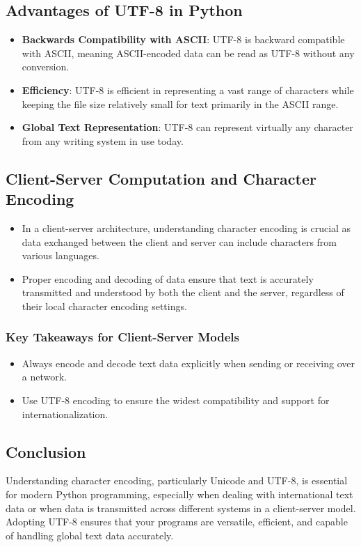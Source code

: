 \documentclass{article}
\begin{document}
\subsection{Advantages of UTF-8 in Python}
\begin{itemize}
    \item \textbf{Backwards Compatibility with ASCII}: UTF-8 is backward compatible with ASCII, meaning ASCII-encoded data can be read as UTF-8 without any conversion.
    \item \textbf{Efficiency}: UTF-8 is efficient in representing a vast range of characters while keeping the file size relatively small for text primarily in the ASCII range.
    \item \textbf{Global Text Representation}: UTF-8 can represent virtually any character from any writing system in use today.
\end{itemize}

\subsection{Client-Server Computation and Character Encoding}
\begin{itemize}
    \item In a client-server architecture, understanding character encoding is crucial as data exchanged between the client and server can include characters from various languages.
    \item Proper encoding and decoding of data ensure that text is accurately transmitted and understood by both the client and the server, regardless of their local character encoding settings.
\end{itemize}

\subsubsection{Key Takeaways for Client-Server Models}
\begin{itemize}
    \item Always encode and decode text data explicitly when sending or receiving over a network.
    \item Use UTF-8 encoding to ensure the widest compatibility and support for internationalization.
\end{itemize}

\subsection{Conclusion}
Understanding character encoding, particularly Unicode and UTF-8, is essential for modern Python programming, especially when dealing with international text data or when data is transmitted across different systems in a client-server model. Adopting UTF-8 ensures that your programs are versatile, efficient, and capable of handling global text data accurately.
\end{document}
